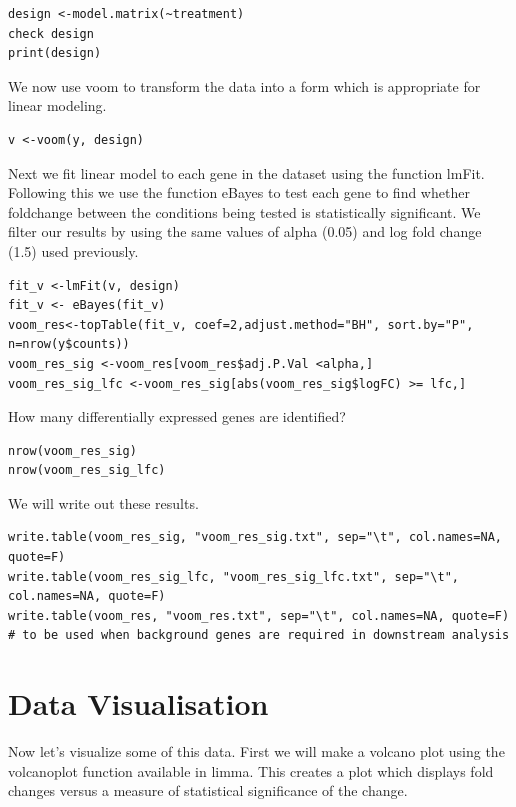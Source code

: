 \begin{steps}
\begin{steps}
\begin{lstlisting}
design <-model.matrix(~treatment)
check design
print(design)
\end{lstlisting}
We now use voom to transform the data into a form which is appropriate for linear modeling.
\begin{lstlisting}
v <-voom(y, design)
\end{lstlisting}
\end{steps}




Next we fit linear model to each gene in the dataset using the function lmFit.  Following this we use the function eBayes to test  each gene to find whether foldchange between the conditions being tested is statistically significant.
We filter our results by using the same values of alpha (0.05) and log fold change (1.5) used previously.

\begin{steps}
\begin{lstlisting}
fit_v <-lmFit(v, design) 
fit_v <- eBayes(fit_v)
voom_res<-topTable(fit_v, coef=2,adjust.method="BH", sort.by="P", n=nrow(y$counts)) 
voom_res_sig <-voom_res[voom_res$adj.P.Val <alpha,]
voom_res_sig_lfc <-voom_res_sig[abs(voom_res_sig$logFC) >= lfc,]
\end{lstlisting}
\end{steps}

How many differentially expressed genes are identified?

\begin{steps}
\begin{lstlisting}
nrow(voom_res_sig)
nrow(voom_res_sig_lfc)
\end{lstlisting}
\end{steps}


We will write out these results.

\begin{steps}
\begin{lstlisting}
write.table(voom_res_sig, "voom_res_sig.txt", sep="\t", col.names=NA, quote=F)
write.table(voom_res_sig_lfc, "voom_res_sig_lfc.txt", sep="\t", col.names=NA, quote=F)
write.table(voom_res, "voom_res.txt", sep="\t", col.names=NA, quote=F) # to be used when background genes are required in downstream analysis
\end{lstlisting}
\end{steps}

\section{Data Visualisation}
Now let’s visualize some of this data. First we will make a volcano plot using the volcanoplot function available in limma. This creates a plot which displays fold changes versus a measure of statistical significance of the change.


\end{steps}
